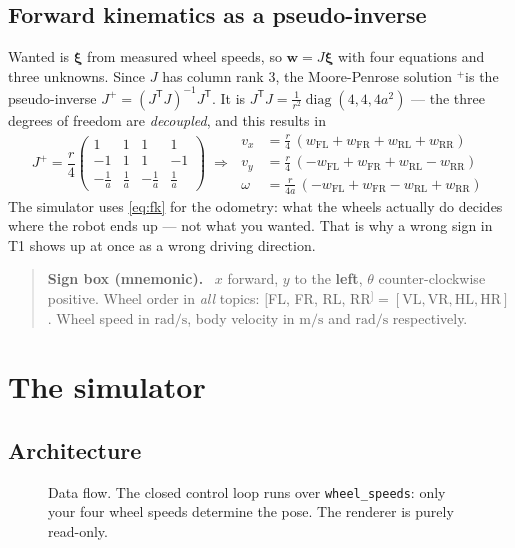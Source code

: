 \documentclass[12pt,a4paper]{scrartcl}
\newcommand{\thema}[1]{\texttt{#1}}
\begin{document}
\subsection{Forward kinematics as a pseudo-inverse}
Wanted is \(\boldsymbol\xi\) from measured wheel speeds, so \(\mathbf w = J
\boldsymbol\xi\) with four equations and three unknowns. Since \(J\) has column rank 3,
the Moore-Penrose solution \(^+\)is the pseudo-inverse
\(J^{+} = (J^{\mathsf T}J)^{-1}J^{\mathsf T}\). It is
\(J^{\mathsf T}J = \tfrac{1}{r^2}\operatorname{diag}(4,4,4a^2)\) — the three degrees of
freedom are \emph{decoupled}, and this results in
\begin{equation}
  J^{+} = \frac{r}{4}\begin{pmatrix}
    1 & 1 & 1 & 1\\ -1 & 1 & 1 & -1\\
    -\tfrac{1}{a} & \tfrac{1}{a} & -\tfrac{1}{a} & \tfrac{1}{a}
  \end{pmatrix}
  \;\Rightarrow\;
  \begin{aligned}
    v_x    &= \tfrac{r}{4}\,(w_\text{FL} + w_\text{FR} + w_\text{RL} + w_\text{RR})\\
    v_y    &= \tfrac{r}{4}\,(-w_\text{FL} + w_\text{FR} + w_\text{RL} - w_\text{RR})\\
    \omega &= \tfrac{r}{4a}\,(-w_\text{FL} + w_\text{FR} - w_\text{RL} + w_\text{RR})
  \end{aligned}
  \label{eq:fk}
\end{equation}
The simulator uses \cref{eq:fk} for the odometry: what the wheels actually
do decides where the robot ends up — not what you wanted. That is why
a wrong sign in T1 shows up at once as a wrong driving direction.

\begin{quote}\small
\textbf{Sign box (mnemonic).}\ \newline
\(x\) forward, \(y\) to the \textbf{left}, \(\theta\) counter-clockwise positive.
Wheel order in \emph{all} topics: \([\)FL, FR, RL, RR\(^] = [\text{VL}, \text{VR},
\text{HL}, \text{HR}]\). Wheel speed in \(\mathrm{rad/s}\), body velocity in
\(\mathrm{m/s}\) and \(\mathrm{rad/s}\) respectively.
\end{quote}

\section{The simulator}
\subsection{Architecture}
\begin{figure}[ht]
  \centering
  
  \caption{Data flow. The closed control loop runs over \thema{wheel\_speeds}:
    only your four wheel speeds determine the pose. The renderer is purely read-only.}
  \label{fig:architektur}
\end{figure}
\end{document}

